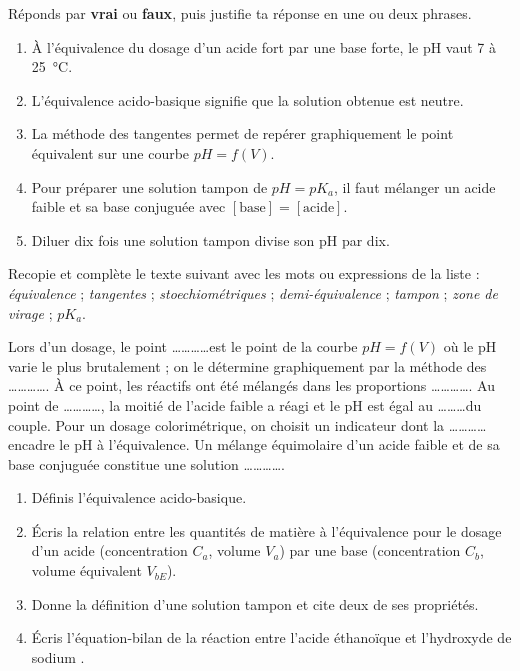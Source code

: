 \documentclass[11pt]{article}
\newcommand{\cle}[1]{{\popxbold\color{popdark}#1}}
\begin{document}
\begin{exercice}
Réponds par \textbf{vrai} ou \textbf{faux}, puis justifie ta réponse en une ou deux phrases.
\begin{enumerate}
\item À l'équivalence du dosage d'un acide fort par une base forte, le pH vaut 7 à \SI{25}{\celsius}.
\item L'équivalence acido-basique signifie que la solution obtenue est neutre.
\item La méthode des tangentes permet de repérer graphiquement le point équivalent sur une courbe $pH = f(V)$.
\item Pour préparer une solution tampon de $pH = pK_a$, il faut mélanger un acide faible et sa base conjuguée avec $[\text{base}] = [\text{acide}]$.
\item Diluer dix fois une solution tampon divise son pH par dix.
\end{enumerate}
\end{exercice}

\begin{exercice}
Recopie et complète le texte suivant avec les mots ou expressions de la liste : \emph{équivalence} ; \emph{tangentes} ; \emph{stoechiométriques} ; \emph{demi-équivalence} ; \emph{tampon} ; \emph{zone de virage} ; \emph{$pK_a$}.

\medskip
Lors d'un dosage, le point \ldots\ldots\ldots\ldots est le point de la courbe $pH = f(V)$ où le pH varie le plus brutalement ; on le détermine graphiquement par la méthode des \ldots\ldots\ldots\ldots. À ce point, les réactifs ont été mélangés dans les proportions \ldots\ldots\ldots\ldots. Au point de \ldots\ldots\ldots\ldots, la moitié de l'acide faible a réagi et le pH est égal au \ldots\ldots\ldots du couple. Pour un dosage colorimétrique, on choisit un indicateur dont la \ldots\ldots\ldots\ldots encadre le pH à l'équivalence. Un mélange équimolaire d'un acide faible et de sa base conjuguée constitue une solution \ldots\ldots\ldots\ldots.
\end{exercice}

\begin{exercice}
\begin{enumerate}
\item Définis l'\cle{équivalence acido-basique}.
\item Écris la relation entre les quantités de matière à l'équivalence pour le dosage d'un acide (concentration $C_a$, volume $V_a$) par une base (concentration $C_b$, volume équivalent $V_{bE}$).
\item Donne la définition d'une \cle{solution tampon} et cite deux de ses propriétés.
\item Écris l'équation-bilan de la réaction entre l'acide éthanoïque  et l'hydroxyde de sodium .
\end{enumerate}
\end{exercice}
\end{document}
